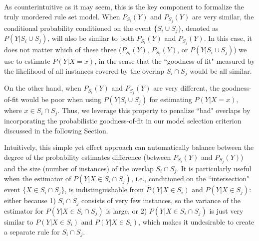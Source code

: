 As counterintuitive as it may seem, this is the key component to formalize the truly unordered rule set model. When $P_{S_i}(Y)$ and $P_{S_j}(Y)$ are very similar, the conditional probability conditioned on the event $\{S_i \cup S_j\}$, denoted as $P(Y|S_i \cup S_j)$, will also be similar to both $P_{S_i}(Y)$ and $P_{S_j}(Y)$. In this case, it does not matter which of these three ($P_{S_i}(Y)$, $P_{S_j}(Y)$, or $P(Y|S_i \cup S_j)$) we use to estimate $P(Y|X=x)$, in the sense that the ``goodness-of-fit" measured by the likelihood of all instances covered by the overlap $S_i \cap S_j$ would be all similar. 

On the other hand, when $P_{S_i}(Y)$ and $P_{S_j}(Y)$ are very different, the goodness-of-fit would be poor when using $P(Y|S_i \cup S_j)$ for estimating $P(Y|X=x)$, where $x \in S_i \cap S_j$. Thus, we leverage this property to penalize ``bad" overlaps by incorporating the probabilistic goodness-of-fit in our model selection criterion discussed in the following Section. 

Intuitively, this simple yet effect approach can automatically balance between the degree of the probability estimates difference (between $P_{S_i}(Y)$ and $P_{S_j}(Y)$) and the size (number of instances) of the overlap $S_i \cap S_j$. It is particularly useful when the estimator of $P(Y|X \in S_i \cap S_j)$, i.e., conditioned on the ``intersection" event $\{X \in S_i \cap S_j\}$, is indistinguishable from $\hat{P}(Y|X \in S_i)$ and $\hat{P}(Y|X \in S_j)$: either because 1) $S_i \cap S_j$ consists of very few instances, so the variance of the estimator for $P(Y|X \in S_i \cap S_j)$ is large, or 2) $P(Y|X \in S_i \cap S_j)$ is just very similar to $P(Y|X \in S_i)$ and $P(Y|X \in S_i)$, which makes it undesirable to create a separate rule for $S_i \cap S_j$. 





